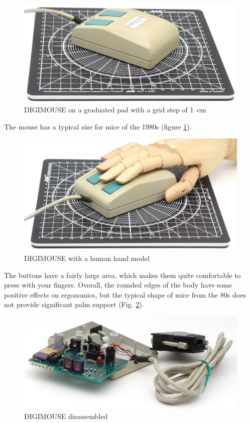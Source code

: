 \documentclass[11pt, a4paper]{article}
\begin{document}
\begin{figure}[h]
    \centering
    \includegraphics[scale=0.6]{1986_sunnyline_digimouse/size_30.jpg}
    \caption{DIGIMOUSE on a graduated pad with a grid step of 1~cm}
    \label{fig:SunnylineDIGIMOUSESize}
\end{figure}

The mouse has a typical size for mice of the 1980s (figure \ref{fig:SunnylineDIGIMOUSESize}).

\begin{figure}[h]
    \centering
    \includegraphics[scale=0.58]{1986_sunnyline_digimouse/hand_30.jpg}
    \caption{DIGIMOUSE with a human hand model}
    \label{fig:SunnylineDIGIMOUSEHand}
\end{figure}

The buttons have a fairly large area, which makes them quite comfortable to press with your fingers. Overall, the rounded edges of the body have some positive effects on ergonomics, but the typical shape of mice from the 80s does not provide significant palm support (Fig. \ref{fig:SunnylineDIGIMOUSEHand}).

 \begin{figure}[h]
    \centering
    \includegraphics[scale=0.65]{1986_sunnyline_digimouse/inside_30.jpg}
    \caption{DIGIMOUSE disassembled}
    \label{fig:SunnylineDIGIMOUSEInside}
\end{figure}
\end{document}
